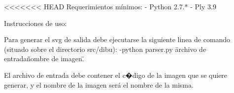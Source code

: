 <<<<<<< HEAD
Requerimientos m\'inimos:
- Python 2.7.*
- Ply 3.9

Instrucciones de uso:

Para generar el svg de salida debe ejecutarse la siguiente linea de comando (situado sobre el directorio src/dibu):
-python parser.py \"archivo de entrada\" \"nombre de imagen\".

El archivo de entrada debe contener el c�digo de la imagen que se quiere generar, y el nombre de la imagen ser\'a el nombre de la misma.
